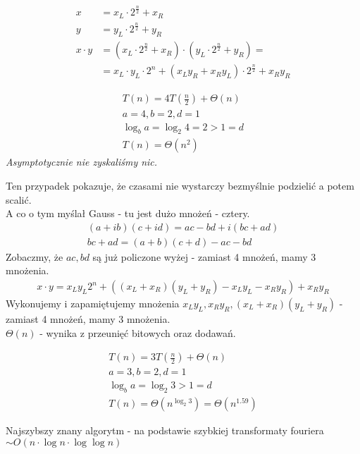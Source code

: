 \documentclass{article}
\numberwithin{equation}{subsection}
\begin{document}
\begin{align}
    x &= x_L \cdot 2^{\frac{n}{2}} + x_R\\
    y &= y_L \cdot 2^{\frac{n}{2}} + y_R\\
    x \cdot y &= \left(x_L \cdot 2^{\frac{n}{2}} + x_R\right) \cdot \left(y_L \cdot 2^{\frac{n}{2}} + y_R\right) =\\
    &= x_L \cdot y_L \cdot 2^n + \left(x_L y_R + x_R y_L\right) \cdot 2^{\frac{n}{2}} + x_R y_R
\end{align}

\begin{align}
    T(n) = 4T\left(\frac{n}{2}\right) + \Theta(n)\\
    a = 4, b = 2, d = 1\\
    \log_b a = \log_2 4 = 2 > 1 = d\\
    T(n) = \Theta(n^2)
\end{align}
\textit{Asymptotycznie nie zyskaliśmy nic.}

\noindent
Ten przypadek pokazuje, że czasami nie wystarczy bezmyślnie podzielić a potem scalić.\\

\noindent
A co o tym myślał Gauss - tu jest dużo mnożeń - cztery.
\begin{align}
    (a+ib)(c+id) = ac - bd + i(bc + ad)\\
    bc + ad = (a + b)(c + d) - ac - bd
\end{align}
Zobaczmy, że $ac, bd$ są już policzone wyżej - zamiast 4 mnożeń, mamy 3 mnożenia.
\begin{align}
    x\cdot y = x_L y_L 2^n + \left((x_L + x_R)(y_L + y_R) - x_Ly_L - x_Ry_R\right) + x_Ry_R
\end{align}
Wykonujemy i zapamiętujemy mnożenia $x_Ly_L, x_Ry_R, (x_L + x_R)(y_L + y_R)$ - zamiast 4 mnożeń, mamy 3 mnożenia.\\

\noindent
$\Theta(n)$ - wynika z przeunięć bitowych oraz dodawań.

\begin{align}
    T(n) = 3T\left(\frac{n}{2}\right) + \Theta(n)\\
    a = 3, b = 2, d = 1\\
    \log_b a = \log_2 3 > 1 = d\\
    T(n) = \Theta(n^{\log_2 3}) = \Theta(n^{1.59})
\end{align}

\noindent
Najszybszy znany algorytm - na podstawie szybkiej transformaty fouriera $\sim O(n\cdot \log n\cdot \log \log n)$
\end{document}
